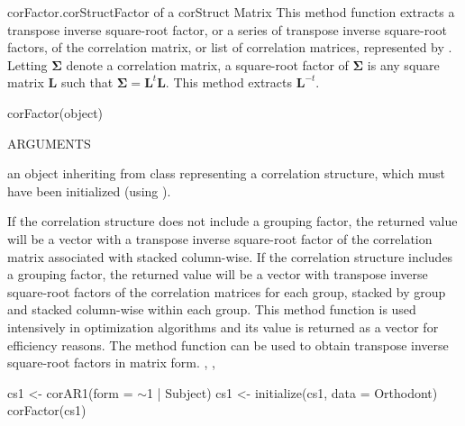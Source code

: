 \documentclass[pdftex]{article} \usepackage{url,graphicx}
\newcommand{\bm}[1]{{\boldsymbol {#1}}}
\newcommand{\bS}{\bm\Sigma}
\newcommand{\bL}{{\bm L}}
\renewcommand{\Twiddle}{\mbox{\(\sim\)}}
\begin{document}
\begin{Helpfile}{corFactor.corStruct}{Factor of a corStruct Matrix}
  This method function extracts a transpose inverse square-root
  factor, or a series of transpose inverse square-root factors, of the
  correlation matrix, or list of correlation matrices, represented by
  . Letting $\bS$ denote a correlation matrix, a
  square-root factor of $\bS$ is any square matrix $\bL$ such that
  $\bS = \bL^t\bL$. This method extracts $\bL^{-t}$.
\begin{Example}
corFactor(object)
\end{Example}
\begin{Argument}{ARGUMENTS}
\item[\Co{object:}]
an object inheriting from class 
representing a correlation structure, which must have been
initialized (using ).
\end{Argument}
If the correlation structure does not include a grouping factor, the
returned value will be a vector with a transpose inverse square-root
factor of the correlation matrix associated with  stacked
column-wise.  If the correlation structure includes a grouping factor,
the returned value will be a vector with transpose inverse
square-root factors of the correlation matrices for each group, stacked
by group and stacked column-wise within each group.
 This method function is used intensively in optimization
algorithms and its value is returned as a vector for efficiency
reasons. The  method function can be used to obtain
transpose inverse square-root factors in matrix form.
,
, 
\need 15pt
\vspace{-16pt} 
\begin{Example}
cs1 <- corAR1(form = \Twiddle 1 | Subject)
cs1 <- initialize(cs1, data = Orthodont)
corFactor(cs1)
\end{Example}
\end{Helpfile}
\end{document}
